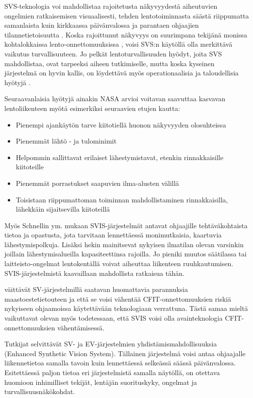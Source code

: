 \documentclass[utf8,bachelor,manualbib]{gradu3}
\begin{document}
SVS-teknologia voi mahdollistaa rajoitetusta näkyvyydestä aiheutuvien ongelmien ratkaisemisen visuaalisesti, tehden lentotoiminnasta säästä riippumatta samanlaista kuin kirkkaassa päivänvalossa ja parantaen ohjaajien tilannetietoisuutta \citep{prinzel2004}. Koska rajoittunut näkyvyys on suurimpana tekijänä monissa kohtalokkaissa lento-onnettomuuksissa \citep{boeing1996}, voisi SVS:n käytöllä olla merkittävä vaikutus turvallisuuteen. Jo pelkät lentoturvallisuuden hyödyt, joita SVS mahdollistaa, ovat tarpeeksi aiheen tutkimiselle, mutta koska kyseinen järjestelmä on hyvin kallis, on löydettävä myös operationaalisia ja taloudellisia hyötyjä \citep{prinzel2004}.

Seuraavanlaisia hyötyjä ainakin NASA \citeyearpar{williamsym2001} arvioi voitavan saavuttaa kasvavan lentoliikenteen myötä esimerkiksi seuraavien etujen kautta:

\begin{itemize}
\item Pienempi ajankäytön tarve kiitotiellä huonon näkyvyyden olosuhteissa
\item Pienemmät lähtö - ja tulominimit
\item Helpommin sallittavat erilaiset lähestymistavat, etenkin rinnakkaisille kiitoteille
\item Pienemmät porrastukset saapuvien ilma-alusten välillä
\item Toisistaan riippumattoman toiminnan mahdollistaminen rinnakkaisilla, lähekkäin sijaitsevilla kiitoteillä
\end{itemize} 

Myös Schnellin ym. \citeyearpar{schnellym2004} mukaan SVIS-järjestelmät antavat ohjaajille tehtäväkohtaista tietoa ja opastusta, jota tarvitaan lennettäessä monimutkaisia, kaartuvia lähestymispolkuja. Lisäksi hekin mainitsevat nykyisen ilmatilan olevan varsinkin joillain lähestymisalueilla kapasiteettinsa rajoilla. Jo pieniki muutos säätilassa tai laitteisto-ongelmat lentokentällä voivat aiheuttaa liikenteen ruuhkautumisen. SVIS-järjestelmistä kaavaillaan mahdollista ratkaisua tähän.

\cite{baileyym2007} väittävät SV-järjestelmillä saatavan huomattavia parannuksia maastoestetietouteen ja että se voisi vähentää CFIT-onnettomuuksien riskiä nykyiseen ohjaamoissa käytettävään teknologiaan verrattuna. Tästä samaa mieltä vaikuttavat olevan myös \cite{schnellym2004} todetessaan, että SVIS voisi olla avainteknologia CFIT-onnettomuuksien vähentämisessä.

Tutkijat selvittävät SV- ja EV-järjestelmien yhdistämismahdollisuuksia (Enhanced Synthetic Vision System). Tällainen järjestelmä voisi antaa ohjaajalle liikennetietoa samalla tavoin kuin lennettäessä selkeässä säässä päivänvalossa. Esitettäessä paljon tietoa eri järjestelmistä samalla näytöllä, on otettava huomioon inhimilliset tekijät, lentäjän suorituskyky, ongelmat ja turvallisuusnäkökohdat. \citep{crawfordneal2006}
\end{document}
